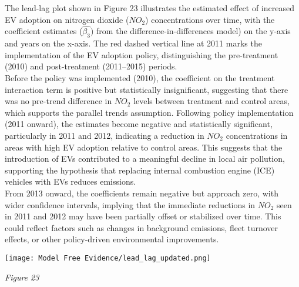 \documentclass[12pt]{article}
\newcommand\tab[1][.50cm]{\hspace*{#1}}
\newenvironment{Figure}
{\par\medskip\noindent\minipage{\linewidth}}
{\endminipage\par\medskip}
\begin{document}
	\begin{multicols}{2}
		
		The lead-lag plot shown in Figure 23 illustrates the estimated effect of increased EV adoption on nitrogen dioxide ($NO_2$) concentrations over time, with the coefficient estimates ($\hat{\beta_3})$ from the difference-in-differences model) on the y-axis and years on the x-axis. The red dashed vertical line at 2011 marks the implementation of the EV adoption policy, distinguishing the pre-treatment (2010) and post-treatment (2011–2015) periods.\\
		\tab Before the policy was implemented (2010), the coefficient on the treatment interaction term is positive but statistically insignificant, suggesting that there was no pre-trend difference in $NO_2$ levels between treatment and control areas, which supports the parallel trends assumption. Following policy implementation (2011 onward), the estimates become negative and statistically significant, particularly in 2011 and 2012, indicating a reduction in $NO_2$ concentrations in areas with high EV adoption relative to control areas. This suggests that the introduction of EVs contributed to a meaningful decline in local air pollution, supporting the hypothesis that replacing internal combustion engine (ICE) vehicles with EVs reduces emissions.\\ 
		\tab From 2013 onward, the coefficients remain negative but approach zero, with wider confidence intervals, implying that the immediate reductions in $NO_2$ seen in 2011 and 2012 may have been partially offset or stabilized over time. This could reflect factors such as changes in background emissions, fleet turnover effects, or other policy-driven environmental improvements.
		
	\end{multicols}
	\begin{Figure}
		\centering
		\texttt{[image: Model Free Evidence/lead\_lag\_updated.png]}
		
	\end{Figure}
	\begin{center}
		\emph{Figure 23}\\
	\end{center}
	
\end{document}
